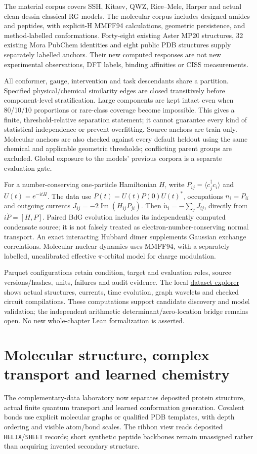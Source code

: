 \documentclass[11pt]{article}
\theoremstyle{definition}\newtheorem{definition}[theorem]{Definition}
\theoremstyle{remark}\newtheorem{remark}[theorem]{Remark}
\begin{document}
The material corpus covers SSH, Kitaev, QWZ, Rice--Mele, Harper and actual
clean-dessin classical RG models. The molecular corpus includes designed
amides and peptides, with explicit-H MMFF94 calculations, geometric persistence,
and method-labelled conformations. Forty-eight existing Aster MP20 structures,
32 existing Mora PubChem identities and eight public PDB structures supply
separately labelled anchors. Their new computed responses are not new
experimental observations, DFT labels, binding affinities or CISS measurements.

All conformer, gauge, intervention and task descendants share a partition.
Specified physical/chemical similarity edges are closed transitively before
component-level stratification. Large components are kept intact even when
80/10/10 proportions or rare-class coverage become impossible. This gives a
finite, threshold-relative separation statement; it cannot guarantee every
kind of statistical independence or prevent overfitting. Source anchors are
train only. Molecular anchors are also checked against every default heldout
using the same chemical and applicable geometric thresholds; conflicting parent
groups are excluded. Global exposure to the models' previous corpora is a separate
evaluation gate.

For a number-conserving one-particle Hamiltonian $H$, write
$P_{ij}=\langle c_j^\dagger c_i\rangle$ and $U(t)=e^{-itH}$.
The data use $P(t)=U(t)P(0)U(t)^*$, occupations $n_i=P_{ii}$ and
outgoing currents $J_{ij}=-2\operatorname{Im}(H_{ij}P_{ji})$.
Then $\dot n_i=-\sum_jJ_{ij}$, directly from $i\dot P=[H,P]$.
Paired BdG evolution includes its independently computed condensate source;
it is not falsely treated as electron-number-conserving normal transport.
An exact interacting Hubbard dimer supplements Gaussian exchange correlations.
Molecular nuclear dynamics uses MMFF94, with a separately labelled,
uncalibrated effective $\pi$-orbital model for charge modulation.

Parquet configurations retain condition, target and evaluation roles, source
versions/hashes, units, failures and audit evidence. The local
\href{http://127.0.0.1:8765/datasets.html}{dataset explorer} shows actual
structures, currents, time evolution, graph wavelets and checked circuit
compilations. These computations support candidate discovery and model
validation; the independent arithmetic determinant/zero-location bridge remains
open. No new whole-chapter Lean formalization is asserted.

\section{Molecular structure, complex transport and learned chemistry}
The complementary-data laboratory now separates deposited protein structure,
actual finite quantum transport and learned conformation generation. Covalent
bonds use explicit molecular graphs or qualified PDB templates, with depth
ordering and visible atom/bond scales. The ribbon view reads deposited
\texttt{HELIX}/\texttt{SHEET} records; short synthetic peptide backbones remain
unassigned rather than acquiring invented secondary structure.
\end{document}
